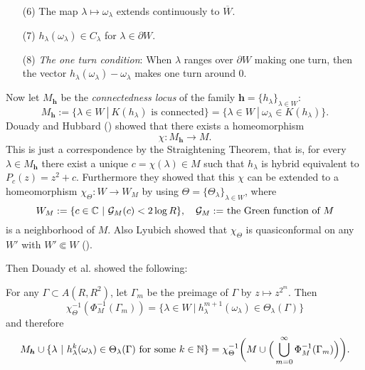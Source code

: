 \begin{itemize}
\item[(6)]
The map $\lambda \mapsto \omega_\lambda$ extends continuously to $\overline{W}$.

\item[(7)]
$h_\lambda(\omega_\lambda) \in C_\lambda$ for $\lambda \in \partial W$.

\item[(8)]
{\it The one turn condition}: 
When $\lambda$ ranges over $\partial W$ making one turn, then the vector
$h_\lambda(\omega_\lambda) - \omega_\lambda$ makes one turn around 0.
\end{itemize}








Now let $M_{\boldsymbol{h}}$ be the {\it connectedness locus} of the family
$\boldsymbol{h} = \{ h_\lambda \}_{\lambda \in W}$:
$$
M_{\boldsymbol{h}} := \{ \lambda \in W \ | \ K(h_\lambda)  \text{ is connected} \}
= \{ \lambda \in W \ | \ \omega_\lambda \in K(h_\lambda) \}.
$$
Douady and Hubbard (\cite[Chapter IV]{Douady-Hubbard 1985}) showed that there
exists a homeomorphism 
$$
  \chi : M_{\boldsymbol{h}} \to M.
$$ 
This is just a correspondence by the Straightening Theorem, that is, for every
$\lambda \in M_{\boldsymbol{h}}$ there exist a unique
$c = \chi(\lambda) \in M$ such that $h_\lambda$ is hybrid equivalent	
to $P_c(z) = z^2 + c$. Furthermore they
showed that this
$\chi$ can be extended to a homeomorphism $\chi_\Theta : W \to W_M$ by using
$\Theta = \{ \Theta_\lambda \}_{\lambda \in W}$, where
$$
  W_M := \{ c \in \mathbb C \ | \ {\mathcal G}_M(c) < 2 \log R \}, 
  \quad {{\mathcal G}_M := }  \text{ the Green function of } M
$$
is a neighborhood of $M$. Also Lyubich showed that $\chi_\Theta$ is 
quasiconformal on any $W'$ with $W' \Subset W$ 
(\cite[p.366, THEOREM 5.5 (The QC Theorem)]{Lyubich 1999}).


Then Douady et al. showed the following:



\begin{prop}\cite[p.29, PROPOSITION 3]{Douady 2000}
For any $\Gamma \subset A(R, R^2)$, 
let $\Gamma_m$ be the preimage of $\Gamma$ by $z \mapsto z^{2^m}$. Then 
$$
  \chi_\Theta^{-1}(\Phi_M^{-1}(\Gamma_m)) 
=\{ \lambda \in W \ | \ h_\lambda^{m+1}(\omega_\lambda) \in \Theta_\lambda(\Gamma) \}
$$
and therefore
$$
  M_{\boldsymbol h}
\cup \{ \lambda \ | \ 
   h_\lambda^k(\omega_\lambda) \in \Theta_\lambda(\Gamma) \ 
   \text{for some} \ k \in \N \}
=
\chi_\Theta^{-1}
\bigg( M \cup \Big( \bigcup_{m=0}^\infty \Phi_M^{-1}(\Gamma_m) \Big) \bigg).
$$
\label{D-BDS Proposition}
\end{prop}


